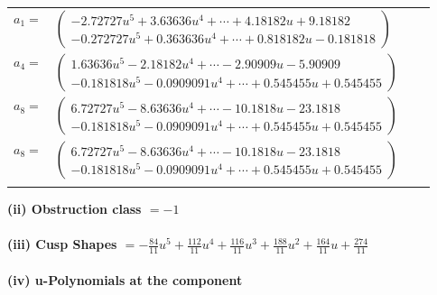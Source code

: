 \documentclass[1p]{elsarticle_modified}
\theoremstyle{definition}
\begin{document}
\begin{tabular}{m{7pt} m{180pt} m{7pt} m{180pt} }
\flushright $a_{1}=$&$\begin{pmatrix}-2.72727 u^{5}+3.63636 u^{4}+\cdots+4.18182 u+9.18182\\-0.272727 u^{5}+0.363636 u^{4}+\cdots+0.818182 u-0.181818\end{pmatrix}$ \\
\flushright $a_{4}=$&$\begin{pmatrix}1.63636 u^{5}-2.18182 u^{4}+\cdots-2.90909 u-5.90909\\-0.181818 u^{5}-0.0909091 u^{4}+\cdots+0.545455 u+0.545455\end{pmatrix}$ \\
\flushright $a_{8}=$&$\begin{pmatrix}6.72727 u^{5}-8.63636 u^{4}+\cdots-10.1818 u-23.1818\\-0.181818 u^{5}-0.0909091 u^{4}+\cdots+0.545455 u+0.545455\end{pmatrix}$\\ \flushright $a_{8}=$&$\begin{pmatrix}6.72727 u^{5}-8.63636 u^{4}+\cdots-10.1818 u-23.1818\\-0.181818 u^{5}-0.0909091 u^{4}+\cdots+0.545455 u+0.545455\end{pmatrix}$\\&\end{tabular}
\flushleft \textbf{(ii) Obstruction class $= -1$}\\~\\
\flushleft \textbf{(iii) Cusp Shapes $= -\frac{84}{11} u^5+\frac{112}{11} u^4+\frac{116}{11} u^3+\frac{188}{11} u^2+\frac{164}{11} u+\frac{274}{11}$}\\~\\
\newpage\renewcommand{\arraystretch}{1}
\flushleft \textbf{(iv) u-Polynomials at the component}\newline \\
\end{document}
